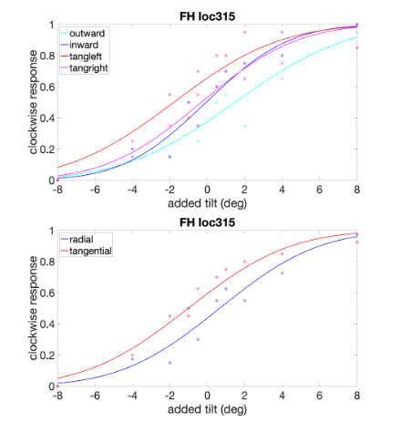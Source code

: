 \documentclass[11pt]{article} %
\begin{document}
\begin{figure}[H]
\centering %
\includegraphics[scale=.15]{Images/FH_PF_loc315_4conds.png}
\includegraphics[scale=.15]{Images/FH_PF_loc315_2conds.png}
\end{figure}

\newpage
\end{document}
